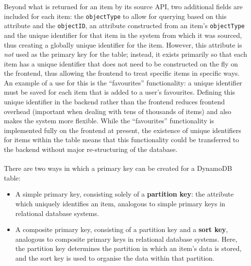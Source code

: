 \documentclass[a4paper,11pt]{report}
\begin{document}
Beyond what is returned for an item by its source API, two additional fields are included for each item:
the \verb|objectType| to allow for querying based on this attribute and the \verb|objectID|, an attribute constructed from an item's \verb|objectType| and the unique identifier for that item in the system from which it was sourced, thus creating a globally unique identifier for the item.
However, this attribute is \textit{not} used as the primary key for the table;
instead, it exists primarily so that each item has a unique identifier that does not need to be constructed on the fly on the frontend, thus allowing the frontend to treat specific items in specific ways.
An example of a use for this is the ``favourites'' functionality: a unique identifier must be saved for each item that is added to a user's favourites.
Defining this unique identifier in the backend rather than the frontend reduces frontend overhead (important when dealing with tens of thousands of items) and also makes the system more flexible.
While the ``favourites'' functionality is implemented fully on the frontend at present, the existence of unique identifiers for items within the table means that this functionality could be transferred to the backend without major re-structuring of the database.
\\\\
There are two ways in which a primary key can be created for a DynamoDB table\supercite{choosing-the-right-key}:
\begin{itemize}
    \item   A simple primary key, consisting solely of a \textbf{partition key}: the attribute which uniquely identifies an item, analogous to simple primary keys in relational database systems.

    \item   A composite primary key, consisting of a partition key and a \textbf{sort key}, analogous to composite primary keys in relational database systems.
            Here, the partition key determines the partition in which an item's data is stored, and the sort key is used to organise the data within that partition.
\end{itemize}
\end{document}
